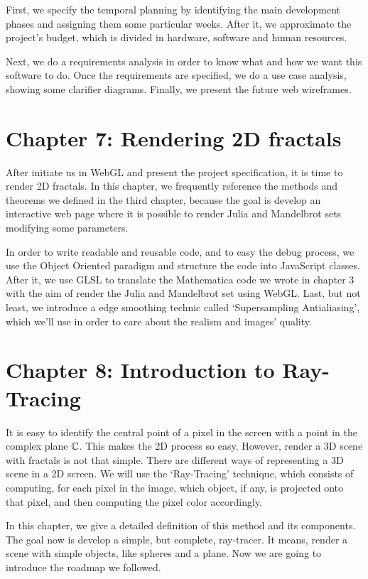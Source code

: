 First, we specify the temporal planning by identifying the main development phases and assigning them some particular weeks. After it, we approximate the project's budget, which is divided in hardware, software and human resources.

Next, we do a requirements analysis in order to know what and how we want this software to do. Once the requirements are specified, we do a use case analysis, showing some clarifier diagrams. Finally, we present the future web wireframes.

\section*{Chapter 7: Rendering 2D fractals}

After initiate us in WebGL and present the project specification, it is time to render 2D fractals. In this chapter, we frequently reference the methods and theorems we defined in the third chapter, because the goal is develop an interactive web page where it is possible to render Julia and Mandelbrot sets modifying some parameters.

In order to write readable and reusable code, and to easy the debug process, we use the Object Oriented paradigm and structure the code into JavaScript classes. After it, we use GLSL to translate the Mathematica code we wrote in chapter 3 with the aim of render the Julia and Mandelbrot set using WebGL. Last, but not least, we introduce a edge smoothing technic called `Supersampling Antialiasing', which we'll use in order to care about the realism and images' quality.

\section*{Chapter 8: Introduction to Ray-Tracing}

It is easy to identify the central point of a pixel in the screen with a point in the complex plane $\mathbb{C}$. This makes the 2D process so easy. However, render a 3D scene with fractals is not that simple. There are different ways of representing a 3D scene in a 2D screen. We will use the `Ray-Tracing' technique, which consists of computing, for each pixel in the image, which object, if any, is projected onto that pixel, and then computing the pixel color accordingly.

In this chapter, we give a detailed definition of this method and its components. The goal now is develop a simple, but complete, ray-tracer. It means, render a scene with simple objects, like spheres and a plane. Now we are going to introduce the roadmap we followed.

